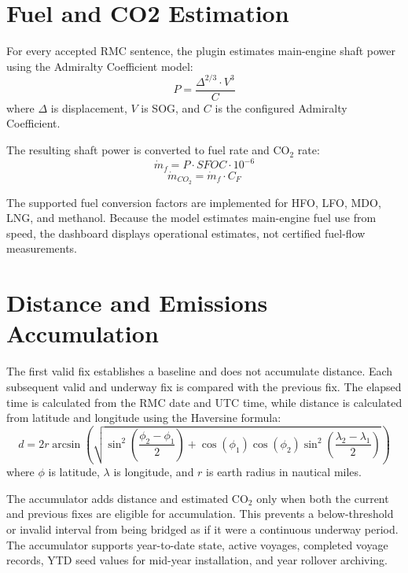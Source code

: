 \section{Fuel and CO2 Estimation}
For every accepted RMC sentence, the plugin estimates main-engine shaft power using the Admiralty Coefficient model:
\begin{equation}
    P = \frac{\Delta^{2/3} \cdot V^3}{C}
    \label{eq:meth-fuel}
\end{equation}
where $\Delta$ is displacement, $V$ is SOG, and $C$ is the configured Admiralty Coefficient.

The resulting shaft power is converted to fuel rate and CO$_2$ rate:
\begin{equation}
    \dot{m}_f = P \cdot SFOC \cdot 10^{-6}
    \label{eq:meth-fuel-rate}
\end{equation}
\begin{equation}
    \dot{m}_{CO_2} = \dot{m}_f \cdot C_F
    \label{eq:meth-co2-rate}
\end{equation}

The supported fuel conversion factors are implemented for HFO, LFO, MDO, LNG, and methanol. Because the model estimates main-engine fuel use from speed, the dashboard displays operational estimates, not certified fuel-flow measurements.

\section{Distance and Emissions Accumulation}
The first valid fix establishes a baseline and does not accumulate distance. Each subsequent valid and underway fix is compared with the previous fix. The elapsed time is calculated from the RMC date and UTC time, while distance is calculated from latitude and longitude using the Haversine formula:
\begin{equation}
    d = 2r \arcsin\left(\sqrt{\sin^2\left(\frac{\phi_2 - \phi_1}{2}\right) + \cos(\phi_1)\cos(\phi_2)\sin^2\left(\frac{\lambda_2 - \lambda_1}{2}\right)}\right)
    \label{eq:haversine}
\end{equation}
where $\phi$ is latitude, $\lambda$ is longitude, and $r$ is earth radius in nautical miles.

The accumulator adds distance and estimated CO$_2$ only when both the current and previous fixes are eligible for accumulation. This prevents a below-threshold or invalid interval from being bridged as if it were a continuous underway period. The accumulator supports year-to-date state, active voyages, completed voyage records, YTD seed values for mid-year installation, and year rollover archiving.

